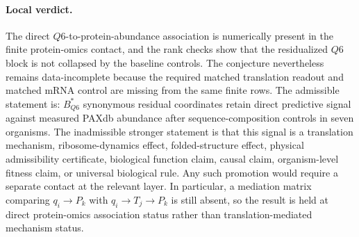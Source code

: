 \paragraph{Local verdict.}
The direct $Q6$-to-protein-abundance association is numerically present in the finite protein-omics contact, and the rank checks show that the residualized $Q6$ block is not collapsed by the baseline controls. The conjecture nevertheless remains data-incomplete because the required matched translation readout and matched mRNA control are missing from the same finite rows. The admissible statement is: $B^{*}_{Q6}$ synonymous residual coordinates retain direct predictive signal against measured PAXdb abundance after sequence-composition controls in seven organisms. The inadmissible stronger statement is that this signal is a translation mechanism, ribosome-dynamics effect, folded-structure effect, physical admissibility certificate, biological function claim, causal claim, organism-level fitness claim, or universal biological rule. Any such promotion would require a separate contact at the relevant layer. In particular, a mediation matrix comparing $q_i \to P_k$ with $q_i \to T_j \to P_k$ is still absent, so the result is held at direct protein-omics association status rather than translation-mediated mechanism status.

